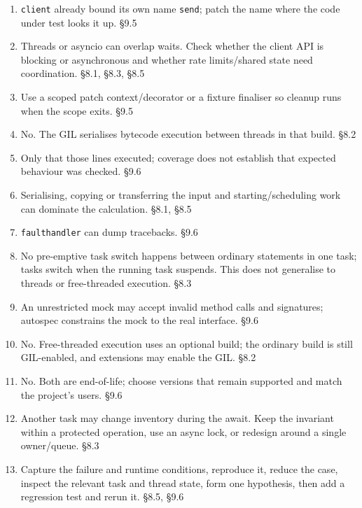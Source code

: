 \documentclass[11pt]{article}
\begin{document}
\begin{keepsection}
\begin{keepsection}
\begin{enumerate}
\item \texttt{client} already bound its own name \texttt{send}; patch the name where the code under test looks it up. \hfill{\small\color{FAUblue}§9.5}
\item Threads or asyncio can overlap waits. Check whether the client API is blocking or asynchronous and whether rate limits/shared state need coordination. \hfill{\small\color{FAUblue}§8.1, §8.3, §8.5}
\item Use a scoped patch context/decorator or a fixture finaliser so cleanup runs when the scope exits. \hfill{\small\color{FAUblue}§9.5}
\item No. The GIL serialises bytecode execution between threads in that build. \hfill{\small\color{FAUblue}§8.2}
\item Only that those lines executed; coverage does not establish that expected behaviour was checked. \hfill{\small\color{FAUblue}§9.6}
\item Serialising, copying or transferring the input and starting/scheduling work can dominate the calculation. \hfill{\small\color{FAUblue}§8.1, §8.5}
\item \texttt{faulthandler} can dump tracebacks. \hfill{\small\color{FAUblue}§9.6}
\item No pre-emptive task switch happens between ordinary statements in one task; tasks switch when the running task suspends. This does not generalise to threads or free-threaded execution. \hfill{\small\color{FAUblue}§8.3}
\item An unrestricted mock may accept invalid method calls and signatures; autospec constrains the mock to the real interface. \hfill{\small\color{FAUblue}§9.6}
\item No. Free-threaded execution uses an optional build; the ordinary build is still GIL-enabled, and extensions may enable the GIL. \hfill{\small\color{FAUblue}§8.2}
\item No. Both are end-of-life; choose versions that remain supported and match the project’s users. \hfill{\small\color{FAUblue}§9.6}
\item Another task may change inventory during the await. Keep the invariant within a protected operation, use an async lock, or redesign around a single owner/queue. \hfill{\small\color{FAUblue}§8.3}
\item Capture the failure and runtime conditions, reproduce it, reduce the case, inspect the relevant task and thread state, form one hypothesis, then add a regression test and rerun it. \hfill{\small\color{FAUblue}§8.5, §9.6}

\end{enumerate}
\end{keepsection}
\end{keepsection}
\end{document}
